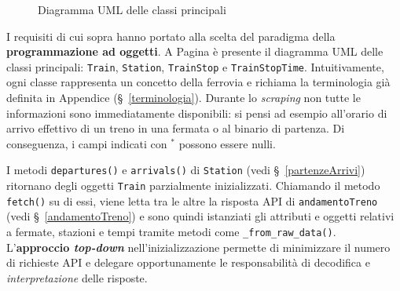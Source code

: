 \documentclass[12pt,italian]{report}
\begin{document}
{\begin{landscape}
\begin{figure}[h]
            \caption{Diagramma UML delle classi principali}
            \vfill
        \end{figure}
    \end{landscape}
    \restoregeometry }

I requisiti di cui sopra hanno portato alla scelta del paradigma della
\textbf{programmazione ad oggetti}.  A Pagina \pageref{uml_classi} è
presente il diagramma UML delle classi principali: \texttt{Train},
\texttt{Station}, \texttt{TrainStop} e \texttt{TrainStopTime}.
Intuitivamente, ogni classe rappresenta un concetto della ferrovia e
richiama la terminologia già definita in Appendice
(\S~\ref{terminologia}).  Durante lo \textit{scraping} non tutte le
informazioni sono immediatamente disponibili: si pensi ad esempio
all'orario di arrivo effettivo di un treno in una fermata o al binario
di partenza.  Di conseguenza, i campi indicati con $^*$ possono essere
nulli.

I metodi \texttt{departures()} e \texttt{arrivals()} di
\texttt{Station} (vedi \S~\ref{partenzeArrivi}) ritornano degli
oggetti \texttt{Train} parzialmente inizializzati.  Chiamando il
metodo \texttt{fetch()} su di essi, viene letta tra le altre la
risposta API di \texttt{andamentoTreno} (vedi \S~\ref{andamentoTreno})
e sono quindi istanziati gli attributi e oggetti relativi a fermate,
stazioni e tempi tramite metodi come \texttt{\_from\_raw\_data()}.
L'\textbf{approccio \textit{top-down}} nell'inizializzazione permette
di minimizzare il numero di richieste API e delegare opportunamente le
responsabilità di decodifica e \textit{interpretazione} delle
risposte.
\end{document}
